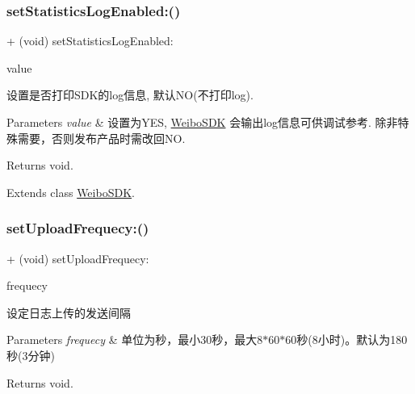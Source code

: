 \subsubsection{\texorpdfstring{set\+Statistics\+Log\+Enabled\+:()}{setStatisticsLogEnabled:()}\hspace{0.1cm}{\footnotesize\ttfamily [3/3]}}
{\footnotesize\ttfamily + (void) set\+Statistics\+Log\+Enabled\+: \begin{DoxyParamCaption}\item[{(B\+O\+OL)}]{value }\end{DoxyParamCaption}}

设置是否打印\+S\+D\+K的log信息, 默认\+NO(不打印log). 
\begin{DoxyParams}{Parameters}
{\em value} & 设置为\+Y\+ES, \mbox{\hyperlink{interface_weibo_s_d_k}{Weibo\+S\+DK}} 会输出log信息可供调试参考. 除非特殊需要，否则发布产品时需改回\+NO. \\
\hline
\end{DoxyParams}
\begin{DoxyReturn}{Returns}
void. 
\end{DoxyReturn}


Extends class \mbox{\hyperlink{interface_weibo_s_d_k_a2e009db32a6d059ff53e35ac211d57f9}{Weibo\+S\+DK}}.

\mbox{\label{category_weibo_s_d_k_07_statistics_08_a6790cf45454697f2b846eb080a130ef2}} 
\subsubsection{\texorpdfstring{set\+Upload\+Frequecy\+:()}{setUploadFrequecy:()}\hspace{0.1cm}{\footnotesize\ttfamily [1/3]}}
{\footnotesize\ttfamily + (void) set\+Upload\+Frequecy\+: \begin{DoxyParamCaption}\item[{(N\+S\+Time\+Interval)}]{frequecy }\end{DoxyParamCaption}}

设定日志上传的发送间隔 
\begin{DoxyParams}{Parameters}
{\em frequecy} & 单位为秒，最小30秒，最大8$\ast$60$\ast$60秒(8小时)。默认为180秒(3分钟) \\
\hline
\end{DoxyParams}
\begin{DoxyReturn}{Returns}
void. 
\end{DoxyReturn}


